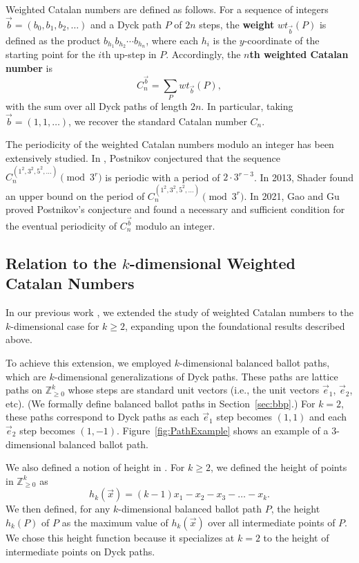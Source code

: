 \documentclass[11pt]{article}
\theoremstyle{remark}
\theoremstyle{definition}
\begin{document}
Weighted Catalan numbers are defined as follows. For a sequence of integers $\vec{b} = (b_0,b_1,b_2,\ldots)$ and a Dyck path $P$ of $2n$ steps, the \textbf{weight} $wt_{\vec{b}}(P)$ is defined as the product $b_{h_1} b_{h_2}\cdots b_{h_n}$, where each $h_i$ is the $y$-coordinate of the starting point for the $i$th up-step in $P$. Accordingly, the \textbf{$n$th weighted Catalan number} is $$C_n^{\vec{b}} = \sum_P wt_{\vec{b}}(P),$$ with the sum over all Dyck paths of length $2n$. In particular, taking $\vec{b}=(1, 1, \dots)$, we recover the standard Catalan number $C_n$.
 
The periodicity of the weighted Catalan numbers modulo an integer has been extensively studied. In \cite{postnikov2000counting}, Postnikov conjectured that the sequence $C^{(1^2, 3^2, 5^2, \dots)}_n \pmod{3^r}$ is periodic with a period of $2\cdot3^{r-3}$. In 2013, Shader \cite{shader2013weighted} found an upper bound on the period of $C^{(1^2, 3^2, 5^2, \dots)}_n \pmod{3^r}$. In 2021, Gao and Gu \cite{gaogu} proved Postnikov's conjecture and found a necessary and sufficient condition for the eventual periodicity of $C_n^{\vec{b}}$ modulo an integer.

\subsection{Relation to the \texorpdfstring{$k$}{k}-dimensional Weighted Catalan Numbers}
In our previous work \cite{MR5034574}, we extended the study of weighted Catalan numbers to the $k$-dimensional case for $k \geq 2$, expanding upon the foundational results described above.

To achieve this extension, we employed $k$-dimensional balanced ballot paths, which are $k$-dimensional generalizations of Dyck paths. These paths are lattice paths on $\mathbb{Z}_{\geq 0}^k$  whose steps are standard unit vectors (i.e., the unit vectors $\vec{e}_1$, $\vec{e}_2$, etc). (We formally define balanced ballot paths in Section~\ref{sec:bbp}.) For $k=2$, these paths correspond to Dyck paths as each $\vec{e}_1$ step becomes $(1,1)$ and each $\vec{e}_2$ step becomes $(1,-1)$. Figure~\ref{fig:PathExample} shows an example of a 3-dimensional balanced ballot path.

We also defined a notion of height in \cite{MR5034574}. For $k\geq 2$, we defined the height of points in  $\mathbb{Z}_{\geq 0}^k$ as \[h_k(\vec{x}) = (k-1)x_1-x_2-x_3 -\dots -x_k.\] We then defined, for any $k$-dimensional balanced ballot path $P$, the height $h_k(P)$ of $P$ as the maximum value of $h_k(\vec{x})$ over all intermediate points of $P$. We chose this height function because it specializes at $k=2$ to the height of intermediate points on Dyck paths.
\end{document}

